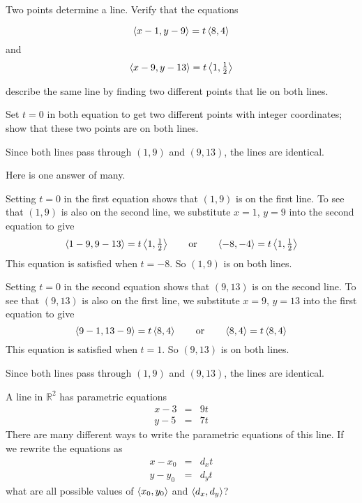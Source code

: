 \begin{question} Two points determine a line. Verify that the equations 

\[\left< x-1,y-9\right>=t\left< 8,4\right>\]
and
\[\left< x-9,y-13\right>=t\left< 1,\tfrac12\right>\]

describe the same line by finding two different points that lie on both lines.
\end{question}
\begin{hint}
Set $t=0$ in both equation to get two different points with integer coordinates; show that these two points are on both lines.
\end{hint}
\begin{answer}
Since both lines pass through $(1,9)$ and $(9,13)$, the lines are identical.
\end{answer}
\begin{solution}
Here is one answer of many. 

Setting $t=0$ in the first equation shows that
$(1,9)$ is on the first line. To see that $(1,9)$ is also on the second line,
we substitute $x=1$, $y=9$ into the second equation to give
\begin{equation*}
\left< 1-9,9-13\right>=t\left< 1,\tfrac12\right>\qquad \text{or}\qquad
\left< -8,-4\right>=t\left< 1,\tfrac12\right>
\end{equation*}
This equation is satisfied when $t=-8$. So $(1,9)$ is on both lines.

Setting $t=0$ in the second equation shows that
$(9,13)$ is on the second line. To see that $(9,13)$ is also on the first line,
we substitute $x=9$, $y=13$ into the first equation to give
\begin{equation*}
\left< 9-1,13-9\right>=t\left< 8,4\right>\qquad \text{or}\qquad
\left< 8,4\right>=t\left< 8,4\right>
\end{equation*}
This equation is satisfied when $t=1$. So $(9,13)$ is on both lines.

Since both lines pass through $(1,9)$ and $(9,13)$, the lines are identical.
\end{solution}
\begin{question}
A line in $\mathbb R^2$ has parametric equations
\[\begin{array}{lcl}
x-3&=&9t\\
y-5&=&7t
\end{array}\]
There are many different ways to write the parametric equations of this line. If we rewrite the equations as
\[\begin{array}{lcl}
x-x_0&=&d_xt\\
y-y_0&=&d_yt
\end{array}\]
what are all possible values of $\left< x_0,y_0\right>$ and $\left< d_x,d_y\right>$?
\end{question}
